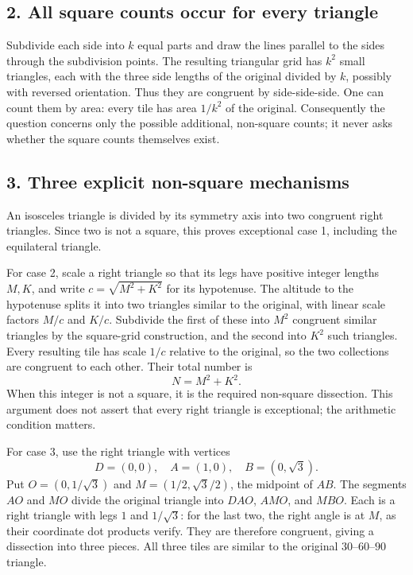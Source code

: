 \subsection*{2. All square counts occur for every triangle}
Subdivide each side into $k$ equal parts and draw the lines parallel to the sides through the subdivision points. The resulting triangular grid has $k^2$ small triangles, each with the three side lengths of the original divided by $k$, possibly with reversed orientation. Thus they are congruent by side-side-side. One can count them by area: every tile has area $1/k^2$ of the original. Consequently the question concerns only the possible additional, non-square counts; it never asks whether the square counts themselves exist.

\subsection*{3. Three explicit non-square mechanisms}
An isosceles triangle is divided by its symmetry axis into two congruent right triangles. Since two is not a square, this proves exceptional case 1, including the equilateral triangle.

For case 2, scale a right triangle so that its legs have positive integer lengths $M,K$, and write $c=\sqrt{M^2+K^2}$ for its hypotenuse. The altitude to the hypotenuse splits it into two triangles similar to the original, with linear scale factors $M/c$ and $K/c$. Subdivide the first of these into $M^2$ congruent similar triangles by the square-grid construction, and the second into $K^2$ such triangles. Every resulting tile has scale $1/c$ relative to the original, so the two collections are congruent to each other. Their total number is
\[
 N=M^2+K^2.
\]
When this integer is not a square, it is the required non-square dissection. This argument does not assert that every right triangle is exceptional; the arithmetic condition matters.

For case 3, use the right triangle with vertices
\[
 D=(0,0),\quad A=(1,0),\quad B=(0,\sqrt3).
\]
Put $O=(0,1/\sqrt3)$ and $M=(1/2,\sqrt3/2)$, the midpoint of $AB$. The segments $AO$ and $MO$ divide the original triangle into $DAO$, $AMO$, and $MBO$. Each is a right triangle with legs $1$ and $1/\sqrt3$: for the last two, the right angle is at $M$, as their coordinate dot products verify. They are therefore congruent, giving a dissection into three pieces. All three tiles are similar to the original $30$--$60$--$90$ triangle.

